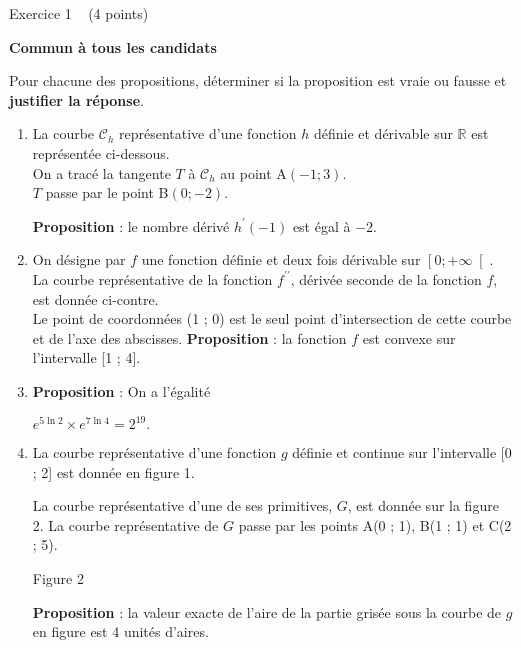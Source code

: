 
%
\begin{h2}Exercice 1   (4 points)\end{h2}
\textbf{Commun à tous les candidats}
\par
Pour chacune des propositions, déterminer si la proposition est vraie ou fausse et \textbf{justifier la réponse}.
\begin{enumerate}
     \item
     La courbe $\mathscr C_{h}$ représentative d'une fonction $h$ définie et dérivable sur $\mathbb{R}$ est représentée  ci-dessous.
\\
     On a tracé la tangente $T$ à $\mathscr C_{h}$ au point A$\left(- 1 ; 3\right)$.
\\     
     $T$ passe par le point B$\left(0 ;-2\right)$.

\begin{center}
\end{center}
     \textbf{Proposition}  : le nombre dérivé $h^{\prime}\left(-1\right)$ est égal à $-2$.
     \item
     On désigne par $f$ une fonction définie et deux fois dérivable sur $\left[0 ;+\infty \right[$.
\\
     La courbe représentative de la fonction $f^{\prime\prime}$, dérivée seconde de la fonction $f$, est donnée ci-contre.
\\
     Le point de coordonnées (1 ; 0) est le seul point d'intersection de cette courbe et de l'axe des abscisses.
     \textbf{Proposition} : la fonction $f$ est convexe sur l'intervalle [1 ; 4]. 
\begin{center}
\end{center}
     \item
     \textbf{Proposition} : On a l'égalité
     \par
     $e^{5\ln 2} \times  e^{7\ln 4}=2^{19}.$
     \item
     La courbe représentative d'une fonction $g$ définie et continue sur l'intervalle [0 ; 2] est donnée en figure 1.

\begin{center}
\end{center}
     La courbe représentative d'une de ses primitives, $G$, est donnée sur la figure 2. La courbe représentative de $G$ passe par les points A(0 ; 1), B(1 ; 1) et C(2 ; 5).

\begin{center}
\end{center}
\begin{center}
Figure 2
\end{center}

     \textbf{Proposition} : la valeur exacte de l'aire de la partie grisée sous la courbe de $g$ en figure est 4 unités d'aires.
\end{enumerate}
